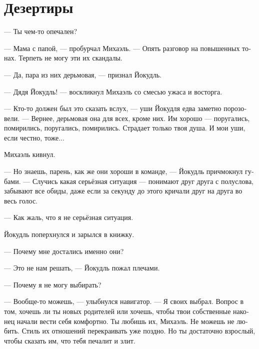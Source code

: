\documentclass[a4paper,12pt,fleqn]{book}\usepackage{polyglossia}\setdefaultlanguage[babelshorthands=true]{russian}\setotherlanguage{english}\defaultfontfeatures{Ligatures=TeX,Mapping=tex-text}\usepackage{xcolor}\newcommand{\ml}[3]{#2}
\begin{document}
\section{Дезертиры}

\ml{$0$}
{--- Ты чем-то опечален?}
{``Are you upset?''}

--- Мама с папой, --- пробурчал Михаэль.
\ml{$0$}
{--- Опять разговор на повышенных тонах.}
{``Raised voices again.}
\ml{$0$}
{Терпеть не могу эти их скандалы.}
{I'm sick of their quarrels.''}

\ml{$0$}
{--- Да, пара из них дерьмовая, --- признал Йокудль.}
{``Yeah, they're a shit of a couple,'' Jökull admitted.}

--- Дядя Йокудль! --- воскликнул Михаэль со смесью ужаса и восторга.

\ml{$0$}
{--- Кто-то должен был это сказать вслух, --- уши Йокудля едва заметно порозовели.}
{``Someone had to say that.'' Jökull's ears turned rosy, barely perceptible.}
\ml{$0$}
{--- Вернее, дерьмовая она для всех, кроме них.}
{``Rephrase: their relationships are shitty for anyone except themselves.}
\ml{$0$}
{Им хорошо --- поругались, помирились, поругались, помирились.}
{They have no problems---fight, peace, fight, peace.}
\ml{$0$}
{Страдает только твоя душа.}
{Only your soul is suffering.}
\ml{$0$}
{И мои уши, если честно, тоже...}
{And, as a matter of fact, my ears too ....''}

Михаэль кивнул.

--- Но знаешь, парень, как же они хороши в команде, --- Йокудль причмокнул губами.
--- Случись какая серьёзная ситуация --- понимают друг друга с полуслова, забывают все обиды, даже если за секунду до этого кричали друг на друга во весь голос.

\ml{$0$}
{--- Как жаль, что я не серьёзная ситуация.}
{``Such a pity, I'm not a critical situation.''}

Йокудль поперхнулся и зарылся в книжку.

--- Почему мне достались именно они?

--- Это не нам решать, --- Йокудль пожал плечами.

--- Почему я не могу выбирать?

--- Вообще-то можешь, --- улыбнулся навигатор.
--- Я своих выбрал.
Вопрос в том, хочешь ли ты новых родителей или хочешь, чтобы твои собственные наконец начали вести себя комфортно.
Ты любишь их, Михаэль.
Не можешь не любить.
Стиль их отношений перекраивать уже поздно.
Но ты достаточно взрослый, чтобы сказать им, что тебя печалит и злит.
\end{document}
